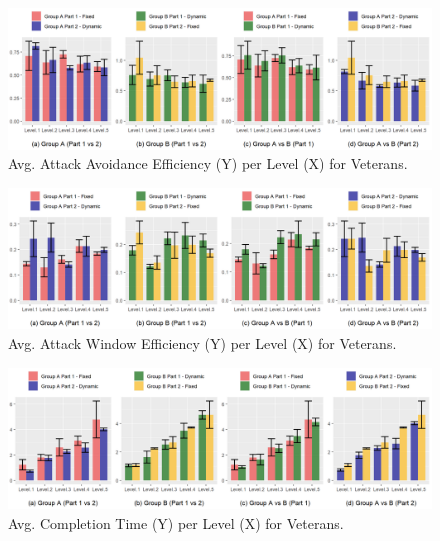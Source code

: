 \begin{figure}[!ht]
    \begin{center}
        \caption{Avg. Attack Avoidance Efficiency (Y) per Level (X) for Veterans.}
        \includegraphics[width=34em]{figures/attack_avoidance_efficiency-veteran_players.png}
    \end{center}
    \label{fig:result-metric-veterans-attack-avoidance-efficiency}
\end{figure}

\begin{figure}[!ht]
    \begin{center}
    \caption{Avg. Attack Window Efficiency (Y) per Level (X) for Veterans.}
        \includegraphics[width=34em]{figures/attack_window_efficiency-veteran_players.png}
    \end{center}
    \label{fig:result-metric-veterans-attack-window-efficiency}
\end{figure}

\begin{figure}[!ht]
    \begin{center}
    \caption{Avg. Completion Time (Y) per Level (X) for Veterans.}
        \includegraphics[width=34em]{figures/completion_time-veteran_players.png}
    \end{center}
    \label{fig:result-metric-veterans-completion-time}
\end{figure}

